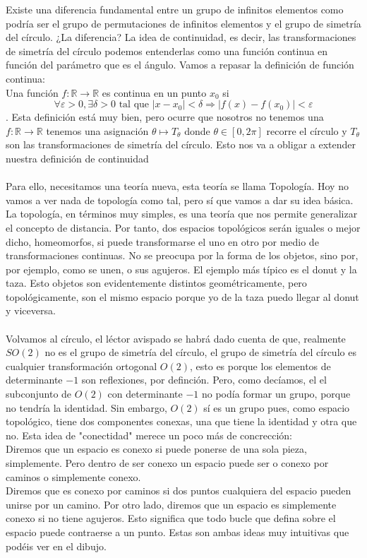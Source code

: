 \documentclass[12pt]{article}
\begin{document}
Existe una diferencia fundamental entre un grupo de infinitos elementos como podría ser el grupo de permutaciones de infinitos elementos y el grupo de simetría del círculo. ¿La diferencia? La idea de continuidad, es decir, las transformaciones de simetría del círculo podemos entenderlas como una función continua en función del parámetro que es el ángulo. Vamos a repasar la definición de función continua:\\
Una función $f:\mathbb{R}\rightarrow\mathbb{R}$ es continua en un punto $x_0$ si $$\forall \varepsilon >0, \exists \delta >0 \text{ tal que }|x-x_0|<\delta \Rightarrow |f(x)-f(x_0)|<\varepsilon$$. 
Esta definición está muy bien, pero ocurre que nosotros no tenemos una $f:\mathbb{R}\rightarrow\mathbb{R}$ tenemos una asignación $\theta\mapsto T_\theta$ donde $\theta\in[0,2\pi]$ recorre el círculo y $T_\theta$ son las transformaciones de simetría del círculo. Esto nos va a obligar a extender nuestra definición de continuidad \\\\
Para ello, necesitamos una teoría nueva, esta teoría se llama Topología. Hoy no vamos a ver nada de topología como tal, pero sí que vamos a dar su idea básica. La topología, en términos muy simples, es una teoría que nos permite generalizar el concepto de distancia. Por tanto, dos espacios topológicos serán iguales o mejor dicho, homeomorfos, si puede transformarse el uno en otro por medio de transformaciones continuas. No se preocupa por la forma de los objetos, sino por, por ejemplo, como se unen, o sus agujeros. El ejemplo más típico es el donut y la taza. Esto objetos son evidentemente distintos geométricamente, pero topológicamente, son el mismo espacio porque yo de la taza puedo llegar al donut y viceversa. \\\\
Volvamos al círculo, el léctor avispado se habrá dado cuenta de que, realmente $SO(2)$ no es el grupo de simetría del círculo, el grupo de simetría del círculo es cualquier transformación ortogonal $O(2)$, esto es porque los elementos de determinante $-1$ son reflexiones, por definción. Pero, como decíamos, el el subconjunto de $O(2)$ con determinante $-1$ no podía formar un grupo, porque no tendría la identidad. Sin embargo, $O(2)$ sí es un grupo pues, como espacio topológico, tiene dos componentes conexas, una que tiene la identidad y otra que no. Esta idea de "conectidad" merece un poco más de concrección: \\
Diremos que un espacio es conexo si puede ponerse de una sola pieza, simplemente. Pero dentro de ser conexo un espacio puede ser o conexo por caminos o simplemente conexo. \\
Diremos que es conexo por caminos si dos puntos cualquiera del espacio pueden unirse por un camino. Por otro lado, diremos que un espacio es simplemente conexo si no tiene agujeros. Esto significa que todo bucle que defina sobre el espacio puede contraerse a un punto. Estas son ambas ideas muy intuitivas que podéis ver en el dibujo. \\\\
\end{document}
